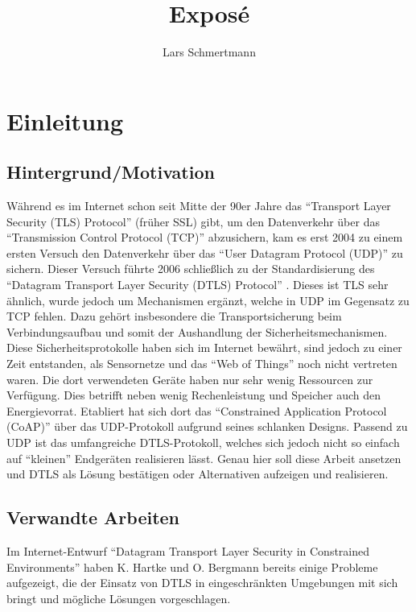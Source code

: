 \documentclass[a4paper,10pt]{report}
\title{Exposé}
\author{Lars Schmertmann}
\begin{document}
\maketitle


\tableofcontents
\clearpage

\chapter{Einleitung}

\section{Hintergrund/Motivation}
Während es im Internet schon seit Mitte der 90er Jahre das  "`Transport Layer Security (TLS) Protocol"' \cite{rfc5246} (früher SSL) gibt,
um den Datenverkehr über das "`Transmission Control Protocol (TCP)"' abzusichern, kam es erst 2004 zu einem ersten Versuch den Datenverkehr
über das "`User Datagram Protocol (UDP)"' zu sichern. Dieser Versuch führte 2006 schließlich zu der Standardisierung des "`Datagram Transport
Layer Security (DTLS) Protocol"' \cite{rfc6347}. Dieses ist TLS sehr ähnlich, wurde jedoch um Mechanismen ergänzt, welche in UDP im Gegensatz
zu TCP fehlen. Dazu gehört insbesondere die Transportsicherung beim Verbindungsaufbau und somit der Aushandlung der Sicherheitsmechanismen.
Diese Sicherheitsprotokolle haben sich im Internet bewährt, sind jedoch zu einer Zeit entstanden, als Sensornetze und das
"`Web of Things"' noch nicht vertreten waren. Die dort verwendeten Geräte haben nur sehr wenig Ressourcen zur Verfügung.
Dies betrifft neben wenig Rechenleistung und Speicher auch den Energievorrat. Etabliert hat sich dort das "`Constrained
Application Protocol (CoAP)"' \cite{draftcoap} über das UDP-Protokoll aufgrund seines schlanken Designs. Passend zu UDP ist
das umfangreiche DTLS-Protokoll, welches sich jedoch nicht so einfach auf "`kleinen"' Endgeräten realisieren lässt.
Genau hier soll diese Arbeit ansetzen und DTLS als Lösung bestätigen oder Alternativen aufzeigen und realisieren.

\section{Verwandte Arbeiten}
Im Internet-Entwurf "`Datagram Transport Layer Security in Constrained Environments"' \cite{draftcodtls} haben K. Hartke und O. Bergmann
bereits einige Probleme aufgezeigt, die der Einsatz von DTLS in eingeschränkten Umgebungen mit sich bringt und mögliche Lösungen vorgeschlagen.
\end{document}

